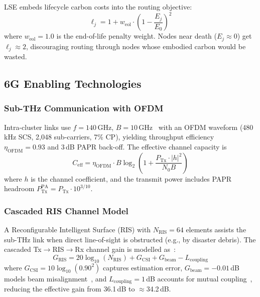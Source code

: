 LSE embeds lifecycle carbon costs into the routing objective:
\begin{equation}
    \ell_j = 1 + w_{\text{eol}} \cdot \left(1 - \frac{E_j}{E_0}\right)^2
    \label{art2:eq:lifecycle_penalty}
\end{equation}
where $w_{\text{eol}} = 1.0$ is the end-of-life penalty weight.
Nodes near death ($E_j \approx 0$) get $\ell_j \approx 2$, discouraging routing through nodes whose embodied carbon would be wasted.

\subsection{6G Enabling Technologies}
\label{art2:sec:6g_enabling}

\subsubsection{Sub-THz Communication with OFDM}
\label{art2:sec:thz}

Intra-cluster links use $f{=}140$\,GHz, $B{=}10$\,GHz~\cite{rappaport2019thz} with an OFDM waveform (480\,kHz SCS, 2{,}048 sub-carriers, 7\% CP), yielding throughput efficiency $\eta_{\text{OFDM}}{=}0.93$ and 3\,dB PAPR back-off.
The effective channel capacity is
\begin{equation}
    C_{\text{eff}} = \eta_{\text{OFDM}} \cdot B \log_2\!\left(1 + \frac{P_{\text{Tx}} \cdot |h|^2}{N_0 B}\right)
    \label{art2:eq:thz_capacity}
\end{equation}
where $h$ is the channel coefficient, and the transmit power includes PAPR headroom $P_{\text{Tx}}^{\text{PA}} = P_{\text{Tx}} \cdot 10^{3/10}$.

\subsubsection{Cascaded RIS Channel Model}
\label{art2:sec:ris}

A Reconfigurable Intelligent Surface (RIS) with $N_{\text{RIS}} = 64$ elements assists the sub-THz link when direct line-of-sight is obstructed (e.g., by disaster debris).
The cascaded Tx$\to$RIS$\to$Rx channel gain is modelled as~\cite{huang2021ris, huang2020ris_drl, alhilo2024ris_uav}:
\begin{equation}
    G_{\text{RIS}} = 20\log_{10}(N_{\text{RIS}}) + G_{\text{CSI}} + G_{\text{beam}} - L_{\text{coupling}}
    \label{art2:eq:ris_gain}
\end{equation}
where $G_{\text{CSI}}{=}10\log_{10}(0.90^2)$ captures estimation error, $G_{\text{beam}}{=}{-}0.01$\,dB models beam misalignment~\cite{alhilo2024ris_uav}, and $L_{\text{coupling}}{=}1$\,dB accounts for mutual coupling~\cite{yang2021ris_jamming}, reducing the effective gain from 36.1\,dB to $\approx$34.2\,dB.

